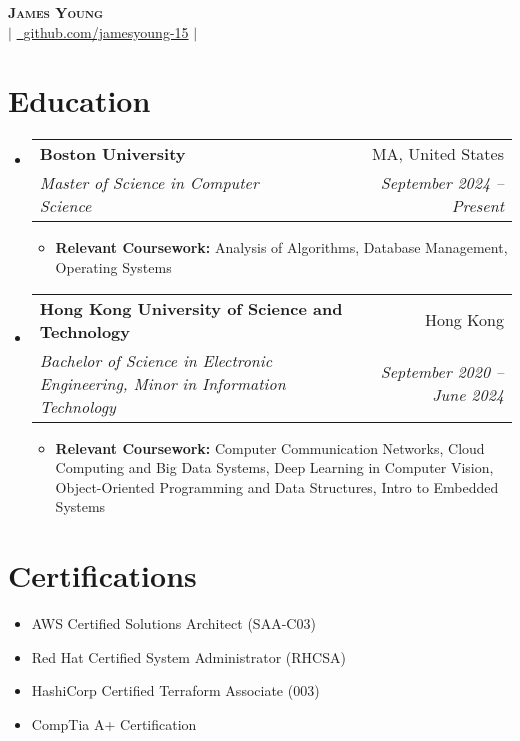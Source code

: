 \documentclass[letterpaper,11pt]{article}
\makeatletter
\newcommand{\resumeItem}[1]{
  \item\small{
    {#1 \vspace{-2pt}}
  }
}
\newcommand{\resumeSubheading}[4]{
  \vspace{-2pt}\item
    \begin{tabular*}{0.97\textwidth}[t]{l@{\extracolsep{\fill}}r}
      \textbf{#1} & #2 \\
      \textit{\small#3} & \textit{\small #4} \\
    \end{tabular*}\vspace{-7pt}
}
\newcommand{\resumeSubHeadingListStart}{\begin{itemize}[leftmargin=0.08in, label={}]}
\newcommand{\resumeSubHeadingListEnd}{\end{itemize}}
\newcommand{\resumeItemListStart}{\begin{itemize}[leftmargin=0.22in]}
\newcommand{\resumeItemListEnd}{\end{itemize}\vspace{-5pt}}
\makeatother
\begin{document}
\begin{center}
    \textbf{\Huge \scshape James Young} \\ \vspace{1pt}
    \small 
    \href{mailto:jamesyoung3931@gmail.com}{} $|$ 
    \href{https://github.com/jamesyoung-15} {\faGithub\ {github.com/jamesyoung-15}} $|$
    \href{https://jyyoung.com}{} %
\end{center}


\section{Education}
  \resumeSubHeadingListStart
    \resumeSubheading
        {Boston University}{MA, United States}
        {Master of Science in Computer Science}{September 2024 -- Present}
        \resumeItemListStart
            \resumeItem{\textbf{Relevant Coursework:} Analysis of Algorithms, Database Management, Operating Systems}
        \resumeItemListEnd
    \resumeSubheading
        {Hong Kong University of Science and Technology}{Hong Kong}
        {Bachelor of Science in Electronic Engineering, Minor in Information Technology}{September 2020 -- June 2024}
        \resumeItemListStart
            \resumeItem{\textbf{Relevant Coursework:} Computer Communication Networks, Cloud Computing and Big Data Systems, Deep Learning in Computer Vision, Object-Oriented Programming and Data Structures, Intro to Embedded Systems}
        \resumeItemListEnd
  \resumeSubHeadingListEnd

\section{Certifications}
    \vspace{-15pt} %
    \vspace{1pt}
    \begin{multicols}{2}
        \begin{itemize}[itemsep=-1pt, parsep=3pt, leftmargin=0.22in]
        \small
            \item AWS Certified Solutions Architect (SAA-C03)
            \item Red Hat Certified System Administrator (RHCSA)
            \item HashiCorp Certified Terraform Associate (003)
            \item CompTia A+ Certification
        \end{itemize}
    \end{multicols}
\end{document}
